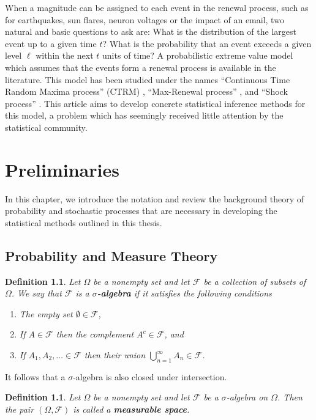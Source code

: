 \documentclass[honours,12pt]{UNSWthesis}
\newcommand{\1}{\mathbf 1}
\newcommand{\FF}{\mathcal{F}}
\newtheorem{definition}[theorem]{Definition}
\numberwithin{equation}{section}
\theoremstyle{definition}
\theoremstyle{remark}
\begin{document}
When a magnitude can be assigned to each event in the renewal process, 
such as for earthquakes, sun flares, neuron voltages or the impact of an email,
two natural and basic questions to ask are: 
What is the distribution of the largest event up to a given time $t$?
What is the probability that an event exceeds a given level $\ell$ within the
next $t$ units of time?
A probabilistic extreme value model which assumes that the events form a 
renewal process is available in the literature. 
This model has been studied under the names
``Continuous Time Random Maxima process'' (CTRM) 
\cite{Benson2007,Meerschaert2009,Hees16,Hees2015}, 
``Max-Renewal process'' \cite{Silvestrov2002a,ST04,Basrak2014}, 
and ``Shock process'' 
\cite{Esary1973,Sumita1983,Sumita1984,Sumita1985,Anderson1987,Gut1999}.
This article aims to develop concrete statistical inference methods for this model, 
a problem which has seemingly received little attention by the statistical 
community.

\chapter{Preliminaries}\label{prelim}
In this chapter, we introduce the notation and review the background theory of probability and stochastic processes that are necessary in developing the statistical methods outlined in this thesis.
\section{Probability and Measure Theory}

\begin{definition}
Let $\Omega$ be a nonempty set and let $\FF$ be a collection of subsets of $\Omega$. We say that $\FF$ is a \textbf{$\sigma$-algebra} if it satisfies the following conditions
\begin{enumerate}
\item The empty set $\emptyset \in \FF$,
\item If $A\in \FF$ then the complement $A^c\in \FF$, and
\item If $A_1,A_2,\ldots \in \FF$ then their union $\bigcup_{n=1}^\infty A_n \in \FF$.
\end{enumerate}
\end{definition}
\noindent It follows that a $\sigma$-algebra is also closed under intersection.\\
\begin{definition}
Let $\Omega$ be a nonempty set and let $\FF$ be a $\sigma$-algebra on $\Omega$. Then the pair $(\Omega,\FF)$ is called a \textbf{measurable space}.\\
\end{definition}
\end{document}
